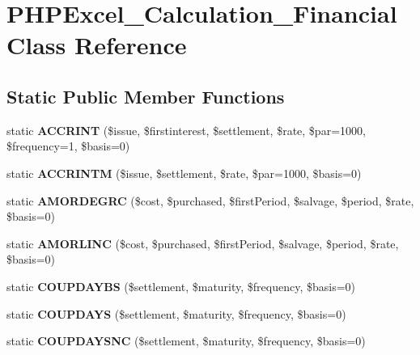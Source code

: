 \section{P\+H\+P\+Excel\+\_\+\+Calculation\+\_\+\+Financial Class Reference}
\label{class_p_h_p_excel___calculation___financial}
\subsection*{Static Public Member Functions}
\begin{DoxyCompactItemize}
\item 
static {\bfseries A\+C\+C\+R\+I\+N\+T} (\$issue, \$firstinterest, \$settlement, \$rate, \$par=1000, \$frequency=1, \$basis=0)\label{class_p_h_p_excel___calculation___financial_aa0e23c8e697504180f8509793f68fd13}

\item 
static {\bfseries A\+C\+C\+R\+I\+N\+T\+M} (\$issue, \$settlement, \$rate, \$par=1000, \$basis=0)\label{class_p_h_p_excel___calculation___financial_a836ae947b6a08955b371aa86bf68e54b}

\item 
static {\bfseries A\+M\+O\+R\+D\+E\+G\+R\+C} (\$cost, \$purchased, \$first\+Period, \$salvage, \$period, \$rate, \$basis=0)\label{class_p_h_p_excel___calculation___financial_a12db491902dcb101fa98ecc82462527c}

\item 
static {\bfseries A\+M\+O\+R\+L\+I\+N\+C} (\$cost, \$purchased, \$first\+Period, \$salvage, \$period, \$rate, \$basis=0)\label{class_p_h_p_excel___calculation___financial_ab2a0f01699d4cafeedb39a4b8a587d22}

\item 
static {\bfseries C\+O\+U\+P\+D\+A\+Y\+B\+S} (\$settlement, \$maturity, \$frequency, \$basis=0)\label{class_p_h_p_excel___calculation___financial_a6add99ddd1d017ce95be604d9a7a7332}

\item 
static {\bfseries C\+O\+U\+P\+D\+A\+Y\+S} (\$settlement, \$maturity, \$frequency, \$basis=0)\label{class_p_h_p_excel___calculation___financial_a237abbf63680cbe7ba9f6aa25719f6c4}

\item 
static {\bfseries C\+O\+U\+P\+D\+A\+Y\+S\+N\+C} (\$settlement, \$maturity, \$frequency, \$basis=0)\label{class_p_h_p_excel___calculation___financial_ac7ee4db3021dc213ae3eb85bbb394f37}


\end{DoxyCompactItemize}
